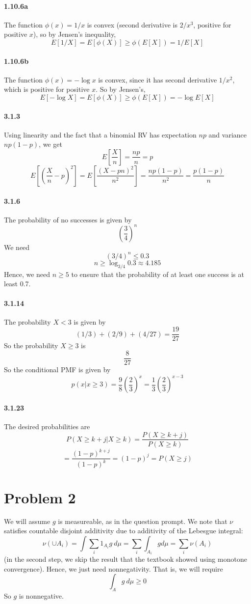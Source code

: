 \documentclass[10pt,letter]{article}
\begin{document}
\paragraph{1.10.6a}
The function $\phi(x) = 1/x$ is convex (second derivative is $2/x^3$, positive for positive $x$), so by Jensen's inequality,
\[ E[1/X] = E[\phi(X)] \ge \phi(E[X]) = 1/E[X] \]
\paragraph{1.10.6b}
The function $\phi(x) = -\log x$ is convex, since it has second derivative $1/x^2$, which is positive for positive $x$. So by Jensen's,
\[ E[-\log X] = E[\phi(X) ] \ge \phi(E[X]) = -\log E[X] \]
\paragraph{3.1.3}
Using linearity and the fact that a binomial RV has expectation $np$ and variance $np(1-p)$, we get
\[ E\left[\frac{X}{n}\right] = \frac{np}{n} = p\]
\[E\left[\left( \frac{X}{n} - p\right)^2\right] = E\left[\frac{(X - pn)^2}{n^2} \right] = \frac{np(1-p)}{n^2} = \frac{p(1-p)}{n}  \]
\paragraph{3.1.6}
The probability of no successes is given by
\[\left(\frac{3}{4}\right)^n \]
We need
\[(3/4)^n \le 0.3 \]
\[ n \ge \log_{3/4} 0.3 \approx 4.185 \]
Hence, we need $n \ge 5$ to ensure that the probability of at least one success is at least 0.7.
\paragraph{3.1.14}
The probability $X < 3$ is given by
\[ (1/3) + (2/9) + (4/27) = \frac{19}{27} \]
So the probability $X \ge 3$ is
\[ \frac{8}{27} \]
So the conditional PMF is given by
\[ p(x | x \ge 3) = \frac{9}{8} \left(\frac{2}{3} \right)^x = \frac{1}{3} \left(\frac{2}{3} \right)^{x-3} \]
\paragraph{3.1.23}
The desired probabilities are
\[ P(X \ge k + j | X \ge k) = \frac{P(X \ge k+j)}{P(X \ge k)} \]
\[ = \frac{(1-p)^{k+j}}{(1-p)^k} = (1-p)^j = P(X \ge j) \]
\section*{Problem 2}
We will assume $g$ is measureable, as in the question prompt.
We note that $\nu$ satisfies countable disjoint additivity due to additivity of the Lebesgue integral:
\[ \nu(\cup A_i) = \int \sum_i 1_{A_i} g \ d\mu = \sum_i \int_{A_i} g d\mu = \sum_i \nu(A_i)\]
(in the second step, we skip the result that the textbook showed using monotone convergence).
Hence, we just need nonnegativity. That is, we will require
\[ \int_A g \ d\mu \ge 0  \]
So $g$ is nonnegative.
\end{document}
